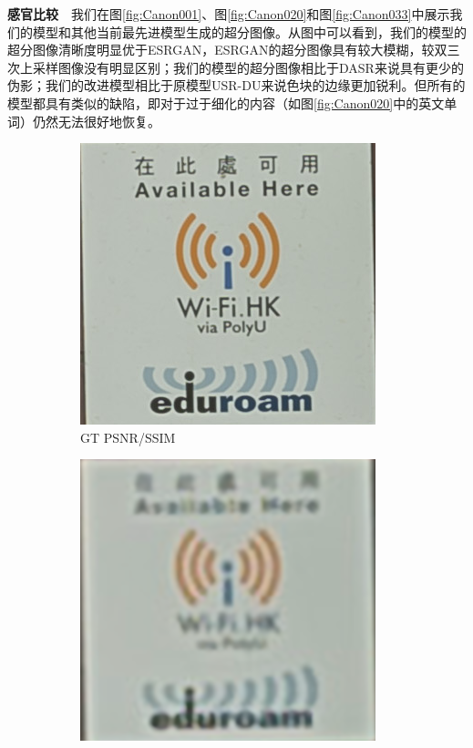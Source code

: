 \noindent\textbf{感官比较}\ \ 我们在图\ref{fig:Canon001}、图\ref{fig:Canon020}和图\ref{fig:Canon033}中展示我们的模型和其他当前最先进模型生成的超分图像。从图中可以看到，我们的模型的超分图像清晰度明显优于ESRGAN，ESRGAN的超分图像具有较大模糊，较双三次上采样图像没有明显区别；我们的模型的超分图像相比于DASR来说具有更少的伪影；我们的改进模型相比于原模型USR-DU来说色块的边缘更加锐利。但所有的模型都具有类似的缺陷，即对于过于细化的内容（如图\ref{fig:Canon020}中的英文单词）仍然无法很好地恢复。

\begin{figure}[htbp]
    \captionsetup[subfigure]{labelformat=empty} 
    \begin{subfigure}{0.3\textwidth}
        \includegraphics[width=\linewidth]{imgs/GT_Canon_001.png}
        \caption{GT PSNR/SSIM} 
    \end{subfigure}
    \hfill
    \begin{subfigure}{0.3\textwidth}
        \includegraphics[width=\linewidth]{imgs/STESRGAN_23.56_0.7960_Canon_001.png}

\end{subfigure}
\end{figure}
